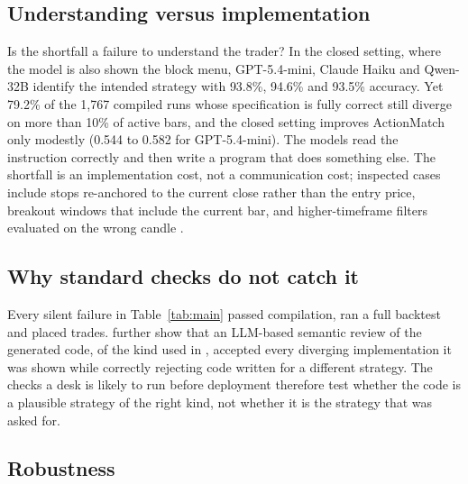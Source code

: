 \documentclass[a4paper,fleqn]{cas-sc}
\begin{document}
\subsection{Understanding versus implementation}
\label{sec:understanding}

Is the shortfall a failure to understand the trader? In the closed setting, where the model is also shown the block menu, GPT-5.4-mini, Claude Haiku and Qwen-32B identify the intended strategy with 93.8\%, 94.6\% and 93.5\% accuracy. Yet 79.2\% of the 1{,}767 compiled runs whose specification is fully correct still diverge on more than 10\% of active bars, and the closed setting improves ActionMatch only modestly (0.544 to 0.582 for GPT-5.4-mini). The models read the instruction correctly and then write a program that does something else. The shortfall is an implementation cost, not a communication cost; inspected cases include stops re-anchored to the current close rather than the entry price, breakout windows that include the current bar, and higher-timeframe filters evaluated on the wrong candle \citep{wang2026minteval}.

\subsection{Why standard checks do not catch it}

Every silent failure in Table~\ref{tab:main} passed compilation, ran a full backtest and placed trades. \citet{wang2026minteval} further show that an LLM-based semantic review of the generated code, of the kind used in \citet{khoroshilov2026}, accepted every diverging implementation it was shown while correctly rejecting code written for a different strategy. The checks a desk is likely to run before deployment therefore test whether the code is a plausible strategy of the right kind, not whether it is the strategy that was asked for.

\subsection{Robustness}
\label{sec:robust}
\end{document}
